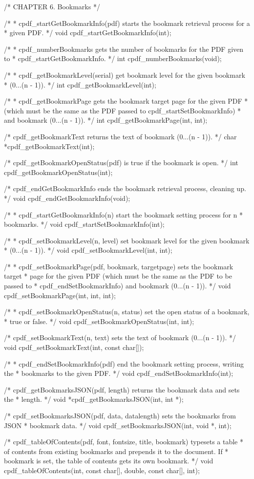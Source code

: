 /* CHAPTER 6. Bookmarks */

/*
 * cpdf_startGetBookmarkInfo(pdf) starts the bookmark retrieval process for a
 * given PDF.
 */
void cpdf_startGetBookmarkInfo(int);

/*
 * cpdf_numberBookmarks gets the number of bookmarks for the PDF given to
 * cpdf_startGetBookmarkInfo.
 */
int cpdf_numberBookmarks(void);

/*
 * cpdf_getBookmarkLevel(serial) get bookmark level for the given bookmark
 * (0...(n - 1)).
 */
int cpdf_getBookmarkLevel(int);

/*
 * cpdf_getBookmarkPage gets the bookmark target page for the given PDF
 * (which must be the same as the PDF passed to cpdf_startSetBookmarkInfo)
 * and bookmark (0...(n - 1)).
 */
int cpdf_getBookmarkPage(int, int);

/* cpdf_getBookmarkText returns the text of bookmark (0...(n - 1)). */
char *cpdf_getBookmarkText(int);

/* cpdf_getBookmarkOpenStatus(pdf) is true if the bookmark is open. */
int cpdf_getBookmarkOpenStatus(int);

/* cpdf_endGetBookmarkInfo ends the bookmark retrieval process, cleaning up. */
void cpdf_endGetBookmarkInfo(void);

/*
 * cpdf_startGetBookmarkInfo(n) start the bookmark setting process for n
 * bookmarks.
 */
void cpdf_startSetBookmarkInfo(int);

/*
 * cpdf_setBookmarkLevel(n, level) set bookmark level for the given bookmark
 * (0...(n - 1)).
 */
void cpdf_setBookmarkLevel(int, int);

/*
 * cpdf_setBookmarkPage(pdf, bookmark, targetpage) sets the bookmark target
 * page for the given PDF (which must be the same as the PDF to be passed to
 * cpdf_endSetBookmarkInfo) and bookmark (0...(n - 1)).
 */
void cpdf_setBookmarkPage(int, int, int);

/*
 * cpdf_setBookmarkOpenStatus(n, status) set the open status of a bookmark,
 * true or false.
 */
void cpdf_setBookmarkOpenStatus(int, int);

/* cpdf_setBookmarkText(n, text) sets the text of bookmark (0...(n - 1)). */
void cpdf_setBookmarkText(int, const char[]);

/*
 * cpdf_endSetBookmarkInfo(pdf) end the bookmark setting process, writing the
 * bookmarks to the given PDF.
 */
void cpdf_endSetBookmarkInfo(int);

/* cpdf_getBookmarksJSON(pdf, length) returns the bookmark data and sets the
 * length. */
void *cpdf_getBookmarksJSON(int, int *);

/* cpdf_setBookmarksJSON(pdf, data, datalength) sets the bookmarks from JSON
 * bookmark data. */
void cpdf_setBookmarksJSON(int, void *, int);

/* cpdf_tableOfContents(pdf, font, fontsize, title, bookmark) typesets a table
 * of contents from existing bookmarks and prepends it to the document. If
 * bookmark is set, the table of contents gets its own bookmark. */
void cpdf_tableOfContents(int, const char[], double, const char[], int);

